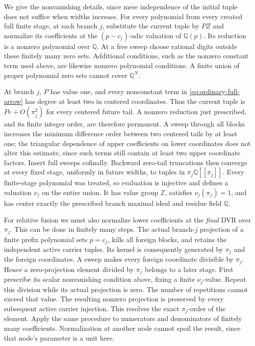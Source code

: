 \documentclass[11pt,reqno]{amsart}
\numberwithin{equation}{section}
\theoremstyle{plain}
\theoremstyle{definition}
\theoremstyle{remark}
\begin{document}
We give the nonvanishing details, since mere independence of the
initial tuple does not suffice when widths increase.
For every polynomial from every created full finite stage, at
each branch \(j\), substitute the current tuple by \(PZ\) and
normalize its coefficients at the \((p-c_j)\)-adic valuation
of \(\mathbb Q(p)\). Its reduction is a nonzero polynomial
over \(\mathbb Q\). At a free sweep choose rational digits
outside these finitely many zero sets. Additional conditions,
such as the nonzero constant term used above, are likewise
nonzero polynomial conditions. A finite union of proper
polynomial zero sets cannot cover \(\mathbb Q^N\).

At branch \(j\), \(P\) has value one, and every nonconstant
term in \eqref{eq:ordinary-full-arrow} has degree at least two
in centered coordinates. Thus the current tuple is
\(Pe+O(\pi_j^2)\) for every centered future tail. A nonzero
reduction just prescribed, and its finite integer order, are
therefore permanent. A sweep through all blocks increases the
minimum difference order between two centered tails by at least
one; the triangular dependence of upper coefficients on lower
coordinates does not alter this estimate, since such terms
still contain at least two upper coordinate factors.
Insert full sweeps cofinally. Backward zero-tail truncations
then converge at every fixed stage, uniformly in future widths,
to tuples in \(\pi_j\mathbb Q[[\pi_j]]\).
Every finite-stage polynomial was treated, so evaluation is
injective and defines a valuation \(\nu_j\) on the entire union.
It has value group \(\mathbb Z\), satisfies
\(\nu_j(\pi_j)=1\), and has center exactly the prescribed
branch maximal ideal and residue field \(\mathbb Q\).

For relative fusion we must also normalize lower coefficients
at the \emph{final} DVR over \(\pi_j\). This can be done in
finitely many steps. The actual branch-\(j\) projection of a
finite prefix polynomial sets \(p=c_j\), kills all foreign
blocks, and retains the independent active carrier tuples.
Its kernel is consequently generated by \(\pi_j\) and the
foreign coordinates. A sweep makes every foreign coordinate
divisible by \(\pi_j\). Hence a zero-projection element divided
by \(\pi_j\) belongs to a later stage.
First prescribe its scalar nonvanishing condition above, fixing
a finite \(\nu_j\)-value. Repeat this division while its actual
projection is zero. The number of repetitions cannot exceed
that value. The resulting nonzero projection is preserved by
every subsequent active carrier injection. This resolves the
exact \(\pi_j\)-order of the element. Apply the same procedure
to numerators and denominators of finitely many coefficients.
Normalization at another node cannot spoil the result, since
that node's parameter is a unit here.
\end{document}
